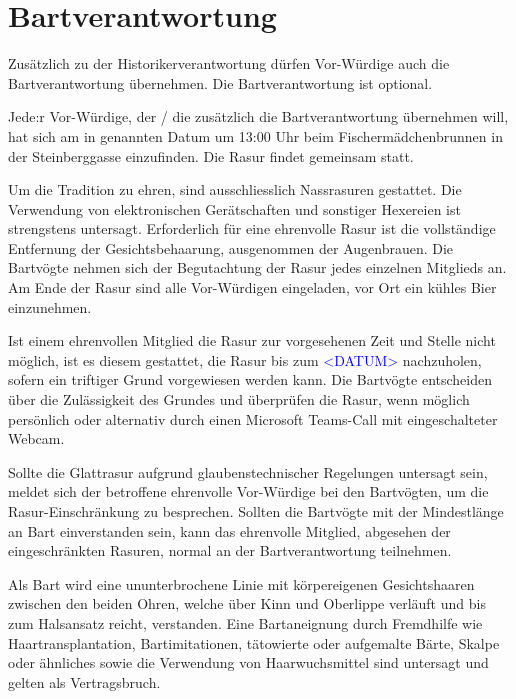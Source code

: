\documentclass[fontsize=12pt,parskip=half]{scrartcl}
\begin{document}
\pagebreak
\section{Bartverantwortung}
\begin{contract}
  \Clause[title={Bartverantwortung}]\label{B.verantwortung}
  Zusätzlich zu der Historikerverantwortung  dürfen Vor-Würdige auch die Bartverantwortung übernehmen. Die Bartverantwortung ist
  optional.

  \Clause[title={Letzte Rasur}]\label{B.lastrasur}
  Jede:r Vor-Würdige, der / die zusätzlich die Bartverantwortung übernehmen will, hat sich am in  genannten Datum um 13:00 Uhr
  beim Fischermädchenbrunnen in der Steinberggasse einzufinden.
  Die Rasur findet gemeinsam statt.

  \SubClause[title={Durchführung der Rasur}]\label{B.durchfuehrung}
  Um die Tradition zu ehren, sind ausschliesslich Nassrasuren gestattet. Die Verwendung von
  elektronischen Gerätschaften und sonstiger Hexereien ist strengstens untersagt. Erforderlich für eine
  ehrenvolle Rasur ist die vollständige Entfernung der Gesichtsbehaarung, ausgenommen der
  Augenbrauen. Die Bartvögte nehmen sich der Begutachtung der Rasur jedes einzelnen Mitglieds
  an.
  \SubClause[title={Anschliessende Kehlenbefeuchtung}]
  Am Ende der Rasur sind alle Vor-Würdigen eingeladen, vor Ort ein kühles Bier einzunehmen.

  \SubClause[title={Rasurverzug}]
  Ist einem ehrenvollen Mitglied die Rasur zur vorgesehenen Zeit und Stelle nicht möglich,
  ist es diesem gestattet, die Rasur bis zum \textcolor{blue}{<DATUM>} nachzuholen, sofern ein triftiger
  Grund vorgewiesen werden kann. Die Bartvögte entscheiden über die Zulässigkeit des Grundes
  und überprüfen die Rasur, wenn möglich persönlich oder alternativ durch einen
  Microsoft Teams-Call mit eingeschalteter Webcam.

  \SubClause[title={Glaubensklausel (Shamess Klausel)}]
  Sollte die Glattrasur aufgrund glaubenstechnischer Regelungen untersagt sein, meldet sich
  der betroffene ehrenvolle Vor-Würdige bei den Bartvögten, um die Rasur-Einschränkung zu
  besprechen. Sollten die Bartvögte mit der Mindestlänge an Bart einverstanden sein,
  kann das ehrenvolle Mitglied, abgesehen der eingeschränkten Rasuren, normal
  an der Bartverantwortung teilnehmen.

  \Clause[title={Bartvorschriften}]
  \SubClause[title={Definition Bart}]
  Als Bart wird eine ununterbrochene Linie mit körpereigenen Gesichtshaaren zwischen den beiden Ohren,
  welche über Kinn und Oberlippe verläuft und bis zum Halsansatz reicht, verstanden. Eine Bartaneignung
  durch Fremdhilfe wie Haartransplantation, Bartimitationen, tätowierte oder aufgemalte Bärte,
  Skalpe oder ähnliches sowie die Verwendung von Haarwuchsmittel sind untersagt und gelten als Vertragsbruch.


\end{contract}
\end{document}
